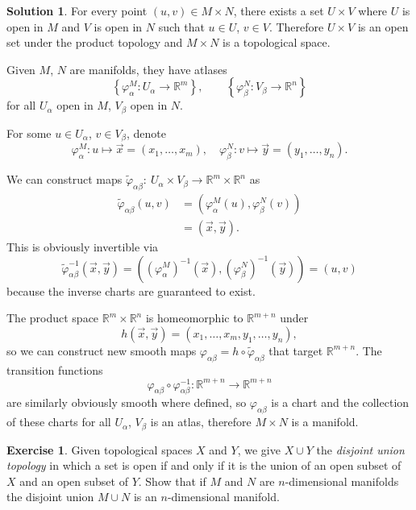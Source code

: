 \documentclass[11pt, a4paper]{report}
\theoremstyle{definition}
\newtheorem{ex}{Exercise}[part]
\newtheorem{sol}{Solution}[part]
\begin{document}
\begin{sol}

For every point $(u, v) \in M \times N$, there exists a set $U \times V$ where $U$ is open in $M$ and $V$ is open in $N$ such that $u \in U$, $v \in V$.
Therefore $U \times V$ is an open set under the product topology and $M \times N$ is a topological space.

Given $M$, $N$ are manifolds, they have atlases
\[
    \left\{\varphi^M_\alpha: U_\alpha \to \mathbb{R}^m \right\}, \qquad
    \left\{\varphi^N_\beta: V_\beta \to \mathbb{R}^n \right\}
\]
for all $U_\alpha$ open in $M$, $V_\beta$ open in $N$.

For some $u \in U_\alpha$, $v \in V_\beta$, denote
\[
    \varphi^M_\alpha: u \mapsto \vec{x} = (x_1, \ldots, x_m), \quad
    \varphi^N_\beta: v \mapsto \vec{y} = (y_1, \ldots, y_n).
\]

We can construct maps $\tilde{\varphi}_{\alpha\beta}:\ U_\alpha \times V_\beta \to \mathbb{R}^m \times \mathbb{R}^n$ as
\begin{align*}
    \tilde{\varphi}_{\alpha\beta} (u, v) &= \left(\varphi^M_\alpha(u), \varphi^N_\beta(v)\right) \\
        &= (\vec{x}, \vec{y}).
\end{align*}
This is obviously invertible via
\[
    \tilde{\varphi}_{\alpha\beta}^{-1}(\vec{x}, \vec{y}) = \left({(\varphi^M_\alpha)}^{-1}(\vec{x}), {(\varphi^N_\beta)}^{-1}(\vec{y})\right) = (u, v)
\]
because the inverse charts are guaranteed to exist.

The product space $\mathbb{R}^m \times \mathbb{R}^n$ is homeomorphic to $\mathbb{R}^{m + n}$ under
\[
    h(\vec{x}, \vec{y}) = (x_1, \ldots, x_m, y_1, \ldots, y_n),
\]
so we can construct new smooth maps $\varphi_{\alpha\beta} = h \circ \tilde{\varphi}_{\alpha\beta}$ that target $\mathbb{R}^{m + n}$.
The transition functions
\[
    \varphi_{\alpha\beta} \circ \varphi_{\alpha\beta}^{-1}: \mathbb{R}^{m + n} \to \mathbb{R}^{m + n}
\]
are similarly obviously smooth where defined, so $\varphi_{\alpha\beta}$ is a chart and the collection of these charts for all $U_\alpha$, $V_\beta$ is an atlas, therefore $M \times N$ is a manifold.

\end{sol}

\begin{ex}

Given topological spaces $X$ and $Y$, we give $X \cup Y$ the \emph{disjoint union topology} in which a set is open if and only if it is the union of an open subset of $X$ and an open subset of $Y$.
Show that if $M$ and $N$ are $n$-dimensional manifolds the disjoint union $M \cup N$ is an $n$-dimensional manifold.

\end{ex}
\end{document}
